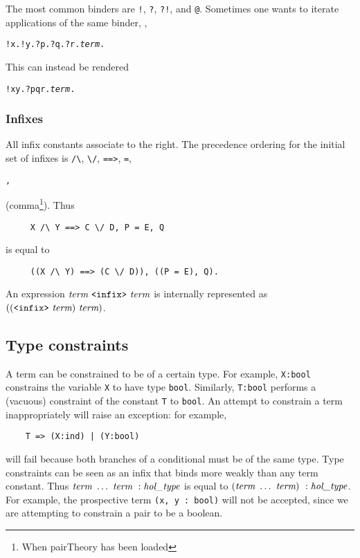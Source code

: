 \documentclass[12pt,fleqn,layout,a4paper]{report}
\newcommand{\type}       {\mbox{\it hol\_type}}
\newcommand{\term}       {\mbox{\it term}}
\begin{document}
 The most common binders are \verb+!+, \verb+?+, \verb+?!+, and
 \verb+@+. Sometimes one wants to iterate applications of the same binder,
 \eg,
 \begin{alltt}
    !x. !y. ?p. ?q. ?r. \term.
 \end{alltt}
 This can instead be rendered
 \begin{alltt}
     !x y. ?p q r. \term.
 \end{alltt}

 \subsubsection{Infixes}

All infix constants associate to the right. The precedence ordering for the
initial set of infixes is
 \verb+/\+, \verb+\/+, \verb+==>+, \verb+=+, \begin{Large}\verb+,+\end{Large}
 (comma\footnote{When pairTheory has been loaded}). Thus
 \begin{verbatim}
     X /\ Y ==> C \/ D, P = E, Q
 \end{verbatim}
 is equal to
 \begin{verbatim}
     ((X /\ Y) ==> (C \/ D)), ((P = E), Q).
 \end{verbatim}

\noindent An expression $\term\ \verb+<infix>+\ \term$ is internally
represented as $((\verb+<infix>+\ \term)\ \term)$.

\subsection{Type constraints}

 A term can be constrained to be of a certain type.  For example,
 \verb+X:bool+ constrains the variable \verb+X+ to have type
 \verb+bool+. Similarly, \verb+T:bool+ performs a (vacuous) constraint of
 the constant \verb+T+ to \verb+bool+. An attempt to constrain a term
 inappropriately will raise an exception: for example,
 \begin{verbatim}
    T => (X:ind) | (Y:bool)
 \end{verbatim}
 will fail because both branches of a conditional must be of the same type.
 Type constraints can be seen as an infix that binds more weakly than any
 term constant. Thus $\term\ \ldots\ \term \ : \type$ is equal to
 $(\term\ \ldots\ \term)\ : \type$. For example, the prospective term
 \verb+(x, y : bool)+ will not be accepted, since we are attempting to
 constrain a pair to be a boolean.
\end{document}
